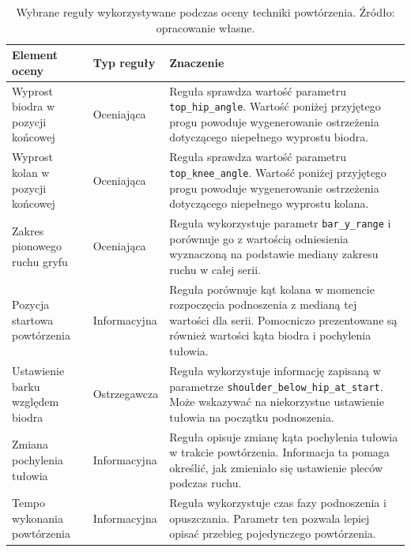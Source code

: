 \begin{table}[H]
\centering
\caption{Wybrane reguły wykorzystywane podczas oceny techniki powtórzenia. Źródło: opracowanie własne.}
\label{tab:reguly-oceny-techniki}
\vspace{0.3cm}
\footnotesize
\renewcommand{\arraystretch}{1.25}
\begin{tabular}{|p{3.8cm}|p{2.8cm}|p{7.0cm}|}
\hline
\textbf{Element oceny} & \textbf{Typ reguły} & \textbf{Znaczenie} \\
\hline

Wyprost biodra w pozycji końcowej & Oceniająca & Reguła sprawdza wartość parametru \texttt{top\_hip\_angle}. Wartość poniżej przyjętego progu powoduje wygenerowanie ostrzeżenia dotyczącego niepełnego wyprostu biodra. \\
\hline

Wyprost kolan w pozycji końcowej & Oceniająca & Reguła sprawdza wartość parametru \texttt{top\_knee\_angle}. Wartość poniżej przyjętego progu powoduje wygenerowanie ostrzeżenia dotyczącego niepełnego wyprostu kolana. \\
\hline

Zakres pionowego ruchu gryfu & Oceniająca & Reguła wykorzystuje parametr \texttt{bar\_y\_range} i porównuje go z wartością odniesienia wyznaczoną na podstawie mediany zakresu ruchu w całej serii. \\
\hline

Pozycja startowa powtórzenia & Informacyjna & Reguła porównuje kąt kolana w momencie rozpoczęcia podnoszenia z medianą tej wartości dla serii. Pomocniczo prezentowane są również wartości kąta biodra i pochylenia tułowia. \\
\hline

Ustawienie barku względem biodra & Ostrzegawcza & Reguła wykorzystuje informację zapisaną w parametrze \texttt{shoulder\_below\_hip\_at\_start}. Może wskazywać na niekorzystne ustawienie tułowia na początku podnoszenia. \\
\hline

Zmiana pochylenia tułowia & Informacyjna & Reguła opisuje zmianę kąta pochylenia tułowia w trakcie powtórzenia. Informacja ta pomaga określić, jak zmieniało się ustawienie pleców podczas ruchu. \\
\hline

Tempo wykonania powtórzenia & Informacyjna & Reguła wykorzystuje czas fazy podnoszenia i opuszczania. Parametr ten pozwala lepiej opisać przebieg pojedynczego powtórzenia. \\
\hline

\end{tabular}
\end{table}


